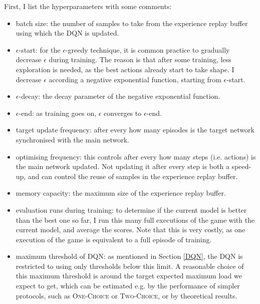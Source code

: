 First, I list the hyperparameters with some comments:

\begin{itemize} 
    \item batch size: the number of samples to take from the experience replay buffer using which the DQN is updated.
    
    \item $\epsilon$-start: for the $\epsilon$-greedy technique, it is common practice to gradually decrease $\epsilon$ during training. The reason is that after some training, less exploration is needed, as the best actions already start to take shape. I decrease $\epsilon$ according a negative exponential function, starting from $\epsilon$-start.
    
    \item $\epsilon$-decay: the decay parameter of the negative exponential function.
    
    \item $\epsilon$-end: as training goes on, $\epsilon$ converges to $\epsilon$-end.
     
    
    \item target update frequency: after every how many episodes is the target network synchronised with the main network.
    
    \item optimising frequency: this controls after every how many steps (i.e. actions) is the main network updated. Not updating it after every step is both a speed-up, and can control the reuse of samples in the experience replay buffer.
    
    \item memory capacity: the maximum size of the experience replay buffer.
    
    \item evaluation runs during training: to determine if the current model is better than the best one so far, I run this many full executions of the game with the current model, and average the scores. Note that this is very costly, as one execution of the game is equivalent to a full episode of training.
    
    \item maximum threshold of DQN: as mentioned in Section \ref{DQN}, the DQN is restricted to using only thresholds below this limit. A reasonable choice of this maximum threshold is around the target expected maximum load we expect to get, which can be estimated e.g. by the performance of simpler protocols, such as \textsc{One-Choice} or \textsc{Two-Choice}, or by theoretical results.
    

\end{itemize}
